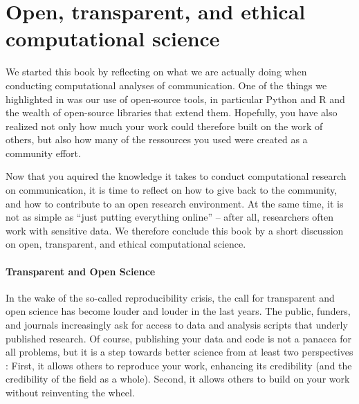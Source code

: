 


\section{Open, transparent, and ethical computational science}
\label{sec:ethics}


We started this book by reflecting on what we are actually doing when conducting computational analyses of communication.
One of the things we highlighted in  was our use of open-source tools, in particular Python and R
and the wealth of open-source libraries that extend them. Hopefully, you have also realized not only how much your work could
therefore built on the work of others, but also how many of the ressources you used were created as a community effort.

Now that you aquired the knowledge it takes to conduct computational research on communication, it is time to reflect
on how to give back to the community, and how to contribute to an open research environment. At the same time, it is
not as simple as ``just putting everything online'' -- after all, researchers often work with sensitive data. We therefore
conclude this book by a short discussion on open, transparent, and ethical computational science.


\paragraph{Transparent and Open Science}
In the wake of the so-called reproducibility crisis, the call for transparent and open science has become louder and louder
in the last years. The public, funders, and journals increasingly ask for access to data and analysis scripts that underly
published research. Of course, publishing your data and code is not a panacea for all problems, but it is a step towards
better science from at least two perspectives \citep{VanAtteveldt2019}: First, it allows others to reproduce your work, enhancing its credibility
(and the credibility of the field as a whole). Second, it allows others to build on your work without reinventing the wheel.

